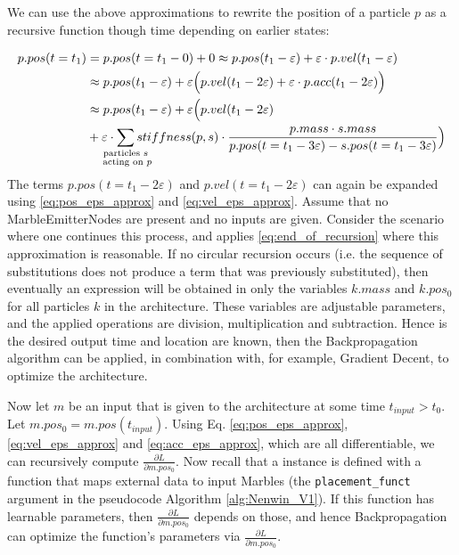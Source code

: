 We can use the above approximations to rewrite the position of a particle $p$ as a recursive function though time depending on earlier states:

\begin{align}
    p.pos(t = t_1)  &= p.pos(t = t_1 - 0) + 0 
                    \approx p.pos(t_1 - \varepsilon) + \varepsilon \cdot p.vel(t_1 - \varepsilon) \nonumber \\
                    &\approx p.pos(t_1 - \varepsilon) + \varepsilon \Big(  p.vel(t_1 - 2\varepsilon) + \varepsilon \cdot p.acc(t_1 - 2\varepsilon) \Big)\nonumber \\
                    &\approx p.pos(t_1 - \varepsilon) + \varepsilon \Big(  p.vel(t_1 - 2\varepsilon) \nonumber \\ &+ \varepsilon \cdot \smashoperator{\sum_{\substack{\text{particles $s$}\\\text{ acting on $p$}}}}stiffness(p, s)\cdot\frac{p.mass \cdot s.mass}{p.pos(t=t_1 -3\varepsilon)-s.pos(t=t_1 -3\varepsilon)} \Big) \label{eq:pos_recursive}
\end{align}
The terms $p.pos(t=t_1 - 2\varepsilon)$ and $p.vel(t = t_1 - 2\varepsilon)$ can again be expanded using \eqref{eq:pos_eps_approx} and \eqref{eq:vel_eps_approx}. Assume that no MarbleEmitterNodes are present and no inputs are given. Consider the scenario where one continues this process, and applies \eqref{eq:end_of_recursion} where this approximation is reasonable. If no circular recursion occurs (i.e. the sequence of substitutions does not produce a term that was previously substituted), then eventually an expression will be obtained in only the variables $k.mass$ and $k.pos_0$ for all particles $k$ in the architecture. These variables are adjustable parameters, and the applied operations are division, multiplication and subtraction. Hence is the desired output time and location are known, then the Backpropagation algorithm can be applied, in combination with, for example, Gradient Decent, to optimize the architecture.

Now let $m$ be an input that is given to the architecture at some time $t_{input} > t_0$. Let $m.pos_0 = m.pos(t_{input})$. Using Eq. \eqref{eq:pos_eps_approx}, \eqref{eq:vel_eps_approx} and \eqref{eq:acc_eps_approx}, which are all differentiable, we can recursively compute $\frac{\partial L}{\partial m.pos_0}$. Now recall that a \nenwin instance is defined with a function that maps external data to input Marbles (the \texttt{placement\_funct} argument in the pseudocode Algorithm \ref{alg:Nenwin_V1}). If this function has learnable parameters, then $\frac{\partial L}{\partial m.pos_0}$ depends on those, and hence Backpropagation can optimize the function's parameters via $\frac{\partial L}{\partial m.pos_0}$.

